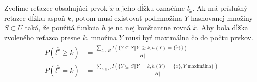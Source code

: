 Zvolíme reťazec obsahujúci prvok $\tilde{x}$ a jeho dĺžku označíme $l_{\tilde{x}}$. Ak má príslušný reťazec dĺžku aspoň $k$, potom musí existovať podmnožina $Y$ hashovanej množiny $S \subset U$ taká, že použitá funkcia $h$ je na nej konštantne rovná $\tilde{x}$. Aby bola dĺžka zvoleného reťazca presne $k$, množina $Y$ musí byť maximálna čo do počtu prvkov.
\begin{displaymath}
\begin{split}
P(l^{\tilde{x}} \geq k) & = \frac{\displaystyle \sum_{h \in H} I(\{ Y \subseteq S | |Y| \geq k, h(Y) = \{ \tilde{x} \} \})}{|H|} \\
P(l^{\tilde{x}} = k) & = \frac{\displaystyle \sum_{h \in H} I(\{ Y \subseteq S | |Y| = k, h(Y) = \{ \tilde{x} \}, Y \text{ maximálna} \})}{|H|} \\
\end{split}
\end{displaymath}

